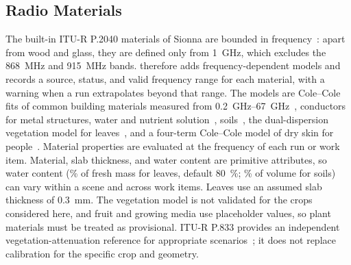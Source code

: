 

\subsection{Radio Materials}\label{sec:materials}
The built-in ITU-R P.2040 materials of Sionna are bounded in frequency~\cite{itu2040}: apart from wood and glass, they are defined only from \SI{1}{GHz}, which excludes the \SI{868}{MHz} and \SI{915}{MHz} bands. \housionna{} therefore adds frequency-dependent models and records a source, status, and valid frequency range for each material, with a warning when a run extrapolates beyond that range. The models are Cole--Cole fits of common building materials measured from \SIrange{0.2}{67}{GHz}~\cite{zhekov2020}, conductors for metal structures, water and nutrient solution~\cite{liebe1991}, soils~\cite{itu527}, the dual-dispersion vegetation model for leaves~\cite{ulaby1987}, and a four-term Cole--Cole model of dry skin for people~\cite{gabriel1996}. Material properties are evaluated at the frequency of each run or work item. Material, slab thickness, and water content are primitive attributes, so water content (\% of fresh mass for leaves, default \SI{80}{\percent}; \% of volume for soils) can vary within a scene and across work items. Leaves use an assumed slab thickness of \SI{0.3}{mm}. The vegetation model is not validated for the crops considered here, and fruit and growing media use placeholder values, so plant materials must be treated as provisional. ITU-R P.833 provides an independent vegetation-attenuation reference for appropriate scenarios~\cite{itu833}; it does not replace calibration for the specific crop and geometry.
